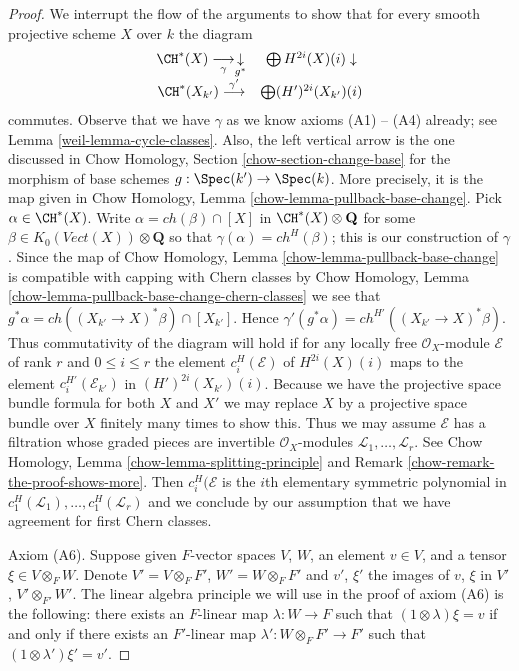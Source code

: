 \begin{proof}
\medskip\noindent
We interrupt the flow of the arguments to show that for every
smooth projective scheme $X$ over $k$ the diagram
$$
\begin{array}{cc}\CH^*(X) \underset{\gamma}{\longrightarrow}\underset{g^*}{\downarrow} & \bigoplus H^{2i}(X)(i) \downarrow \\ \CH^*(X_{k'}) \overset{\gamma'}{\longrightarrow} & \bigoplus (H')^{2i}(X_{k'})(i)\end{array}
$$
commutes. Observe that we have $\gamma$ as we know axioms
(A1) -- (A4) already; see Lemma \ref{weil-lemma-cycle-classes}.
Also, the left vertical arrow is the one discussed in
Chow Homology, Section \ref{chow-section-change-base}
for the morphism of base schemes $g : \Spec(k') \to \Spec(k)$.
More precisely, it is the map given in
Chow Homology, Lemma \ref{chow-lemma-pullback-base-change}.
Pick $\alpha \in \CH^*(X)$. Write $\alpha = ch(\beta) \cap [X]$
in $\CH^*(X) \otimes \mathbf{Q}$
for some $\beta \in K_0(\textit{Vect}(X)) \otimes \mathbf{Q}$
so that $\gamma(\alpha) = ch^{H}(\beta)$; this is our construction of $\gamma$.
Since the map of Chow Homology, Lemma \ref{chow-lemma-pullback-base-change}
is compatible with capping with Chern classes by
Chow Homology, Lemma \ref{chow-lemma-pullback-base-change-chern-classes}
we see that $g^*\alpha = ch((X_{k'} \to X)^*\beta) \cap [X_{k'}]$.
Hence $\gamma'(g^*\alpha) = ch^{H'}((X_{k'} \to X)^*\beta)$.
Thus commutativity of the diagram will hold if for any locally
free $\mathcal{O}_X$-module $\mathcal{E}$ of rank $r$ and $0 \leq i \leq r$
the element $c_i^H(\mathcal{E})$ of $H^{2i}(X)(i)$
maps to the element $c_i^{H'}(\mathcal{E}_{k'})$ in $(H')^{2i}(X_{k'})(i)$.
Because we have the projective space bundle formula for both
$X$ and $X'$ we may replace $X$ by a projective space bundle
over $X$ finitely many times to show this. Thus we may assume
$\mathcal{E}$ has a filtration whose graded pieces are
invertible $\mathcal{O}_X$-modules
$\mathcal{L}_1, \ldots, \mathcal{L}_r$.
See Chow Homology, Lemma \ref{chow-lemma-splitting-principle} and
Remark \ref{chow-remark-the-proof-shows-more}.
Then $c^H_i(\mathcal{E}$ is the $i$th elementary symmetric polynomial
in $c^H_1(\mathcal{L}_1), \ldots, c^H_1(\mathcal{L}_r)$
and we conclude by our assumption that we have agreement for
first Chern classes.

\medskip\noindent
Axiom (A6). Suppose given $F$-vector spaces
$V$, $W$, an element $v \in V$, and a tensor $\xi \in V \otimes_F W$.
Denote $V' = V \otimes_F F'$, $W' = W \otimes_F F'$ and $v'$, $\xi'$
the images of $v$, $\xi$ in $V'$, $V' \otimes_{F'} W'$. The linear algebra
principle we will use in the proof of axiom (A6) is the following:
there exists an $F$-linear map $\lambda : W \to F$ such that
$(1 \otimes \lambda)\xi = v$ if and only if there exists an $F'$-linear
map $\lambda' : W \otimes_F F' \to F'$ such that
$(1 \otimes \lambda')\xi' = v'$.


\end{proof}
